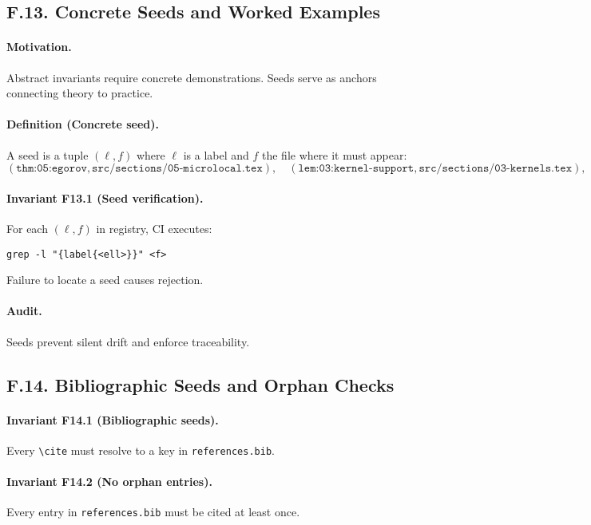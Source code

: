 \subsection*{F.13. Concrete Seeds and Worked Examples}

\paragraph{Motivation.}
Abstract invariants require concrete demonstrations. Seeds serve as
anchors connecting theory to practice.

\paragraph{Definition (Concrete seed).}
A seed is a tuple $(\ell,f)$ where $\ell$ is a label and $f$ the file
where it must appear:
\[
(\texttt{thm:05:egorov}, \texttt{src/sections/05-microlocal.tex}), \quad
(\texttt{lem:03:kernel-support}, \texttt{src/sections/03-kernels.tex}), \quad
(\texttt{eq:07:traceformula}, \texttt{src/sections/07-trace.tex}).
\]

\paragraph{Invariant F13.1 (Seed verification).}
For each $(\ell,f)$ in registry, CI executes:
\begin{verbatim}
grep -l "{label{<ell>}}" <f>
\end{verbatim}
Failure to locate a seed causes rejection.

\paragraph{Audit.}
Seeds prevent silent drift and enforce traceability.

\subsection*{F.14. Bibliographic Seeds and Orphan Checks}

\paragraph{Invariant F14.1 (Bibliographic seeds).}
Every \texttt{\textbackslash cite} must resolve to a key in
\texttt{references.bib}.

\paragraph{Invariant F14.2 (No orphan entries).}
Every entry in \texttt{references.bib} must be cited at least once.

